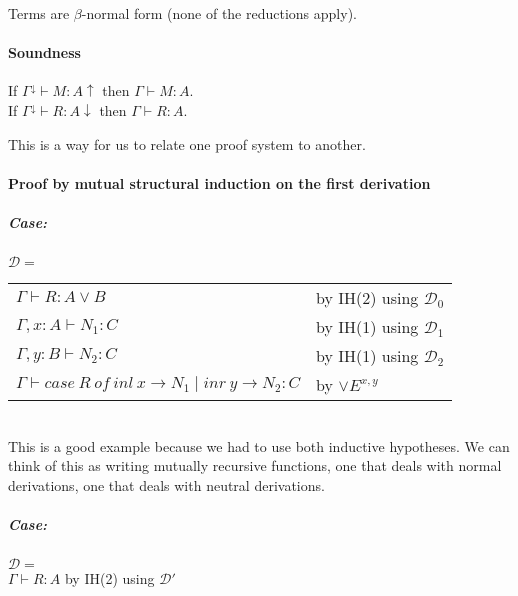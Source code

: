 \documentclass[12 pt]{article}
\begin{document}
        Terms are $\beta$-normal form (none of the reductions apply).
        \paragraph{Soundness} If $\Gamma^{\downarrow} \vdash M : A
        \uparrow$ then $\Gamma \vdash M : A$.
        \\ If $\Gamma^{\downarrow} \vdash R:A \downarrow$ then $\Gamma
        \vdash R : A$.

        This is a way for us to relate one proof system to another.

        \paragraph{Proof by mutual structural induction on  the first
          derivation}
        \subparagraph{Case:} $\mathcal{D} =$
        \noLine
        \noLine
        \noLine
        \DP
        \\
        \begin{tabular}{l l}
          $\Gamma \vdash R : A \lor B$& by IH(2) using $\mathcal{D}_0$
          \\ $\Gamma, x : A \vdash N_1 : C$ & by IH(1) using $\mathcal{D}_1$
          \\ $\Gamma, y : B \vdash N_2 : C$ & by IH(1) using $\mathcal{D}_2$
          \\ $\Gamma \vdash case\ R \ of \ inl\ x \to N_1 \mid inr\ y \to N_2 : C$ & by $\lor E^{x,y}$
        \end{tabular}
        \\This is a good example because we had to use both inductive
        hypotheses. We can think of this as writing mutually recursive
        functions, one that deals with normal derivations, one that
        deals with neutral derivations.
        \subparagraph{Case:} $\mathcal{D}=$
        \noLine{}\DP
        \\ $\Gamma \vdash R : A$ by IH(2) using $\mathcal{D}'$
\end{document}
